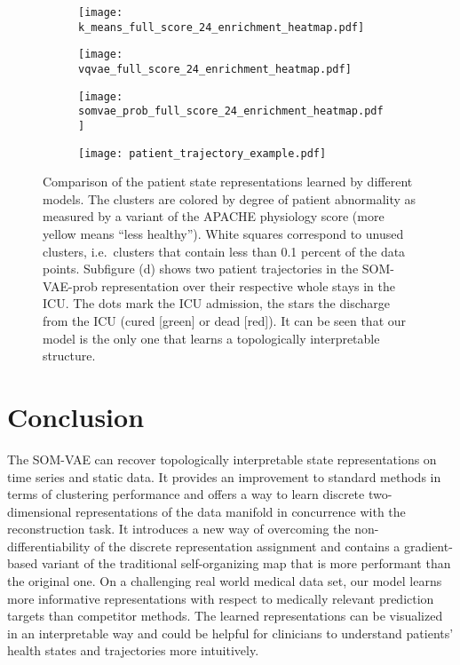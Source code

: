 \documentclass{article}
\begin{document}
\begin{figure}
\centering
\begin{subfigure}[t]{0.22\textwidth}
\centering
\texttt{[image: k\_means\_full\_score\_24\_enrichment\_heatmap.pdf]}
\end{subfigure}
\begin{subfigure}[t]{0.22\textwidth}
\centering
\texttt{[image: vqvae\_full\_score\_24\_enrichment\_heatmap.pdf]}
\end{subfigure}
\begin{subfigure}[t]{0.22\textwidth}
\centering
\texttt{[image: somvae\_prob\_full\_score\_24\_enrichment\_heatmap.pdf]}
\label{fig:ICU_representations}
\end{subfigure}
\begin{subfigure}[t]{0.22\textwidth}
\centering
\texttt{[image: patient\_trajectory\_example.pdf]}
\label{fig:patient_trajectories}
\end{subfigure}
\caption{Comparison of the patient state representations learned by different models. The clusters are colored by degree of patient abnormality as measured by a variant of the APACHE physiology score (more yellow means ``less healthy'').
White squares correspond to unused clusters, i.e.\ clusters that contain less than 0.1 percent of the data points.
Subfigure (d) shows two patient trajectories in the SOM-VAE-prob representation over their respective whole stays in the ICU.
The dots mark the ICU admission, the stars the discharge from the ICU (cured [green] or dead [red]).
It can be seen that our model is the only one that learns a topologically interpretable structure.
}
\label{fig:heatmaps}
\end{figure}


 
\FloatBarrier

\section{Conclusion}

The SOM-VAE can recover topologically interpretable state representations on time series and static data.
It provides an improvement to standard methods in terms of clustering performance and offers a way to learn discrete two-dimensional representations of the data manifold in concurrence with the reconstruction task.
It introduces a new way of overcoming the non-differentiability of the discrete representation assignment and contains a gradient-based variant of the traditional self-organizing map that is more performant than the original one.
On a challenging real world medical data set, our model learns more informative representations with respect to medically relevant prediction targets than competitor methods.
The learned representations can be visualized in an interpretable way and could be helpful for clinicians to understand patients' health states and trajectories more intuitively.
\end{document}

